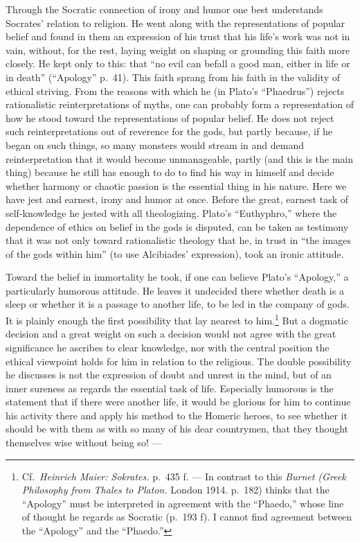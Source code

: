 \documentclass[12pt]{book}
\newcommand{\opage}[1]{\marginnote{\footnotesize\textit{[#1]}}}
\begin{document}
\opage{150}Through the Socratic connection of irony and humor one best understands Socrates'
relation to religion. He went along with the representations of popular belief and found in them
an expression of his trust that his life's work was not in vain, without, for the rest, laying
weight on shaping or grounding this faith more closely. He kept only to this: that ``no evil can
befall a good man, either in life or in death'' (``Apology'' p.~41). This faith sprang from his
faith in the validity of ethical striving. From the reasons with which he (in Plato's
``Phaedrus'') rejects rationalistic reinterpretations of myths, one can probably form a
representation of how he stood toward the representations of popular belief. He does not reject
such reinterpretations out of reverence for the gods, but partly because, if he began on such
things, so many monsters would stream in and demand reinterpretation that it would become
unmanageable, partly (and this is the main thing) because he still has enough to do to find his
way in himself and decide whether harmony or chaotic passion is the essential thing in his nature.
Here we have jest and earnest, irony and humor at once. Before the great, earnest task of
self-knowledge he jested with all theologizing. Plato's ``Euthyphro,'' where the dependence of
ethics on belief in the gods is disputed, can be taken as testimony that it was not only toward
rationalistic theology that he, in trust in ``the images of the gods within him'' (to use
Alcibiades' expression), took an ironic attitude.

Toward the belief in immortality he took, if one can believe Plato's ``Apology,'' a particularly
humorous attitude. He leaves it undecided there whether death is a sleep or whether it is a
passage to another life, to be led in the company of gods. It is plainly enough the first
possibility that lay nearest to him.\footnote{Cf.\ \textit{Heinrich Maier: Sokrates.} p.~435 f.
--- In contrast to this \textit{Burnet (Greek Philosophy from Thales to Platon.} London 1914.
p.~182) thinks that the ``Apology'' must be interpreted in agreement with the ``Phaedo,'' whose
line of thought he regards as Socratic (p.~193 f). I cannot find agreement between the ``Apology''
and the ``Phaedo.''} But a dogmatic decision and a great weight on such a \opage{151}decision
would not agree with the great significance he ascribes to clear knowledge, nor with the central
position the ethical viewpoint holds for him in relation to the religious. The double possibility
he discusses is not the expression of doubt and unrest in the mind, but of an inner sureness as
regards the essential task of life. Especially humorous is the statement that if there were
another life, it would be glorious for him to continue his activity there and apply his method to
the Homeric heroes, to see whether it should be with them as with so many of his dear countrymen,
that they thought themselves wise without being so! ---
\end{document}
